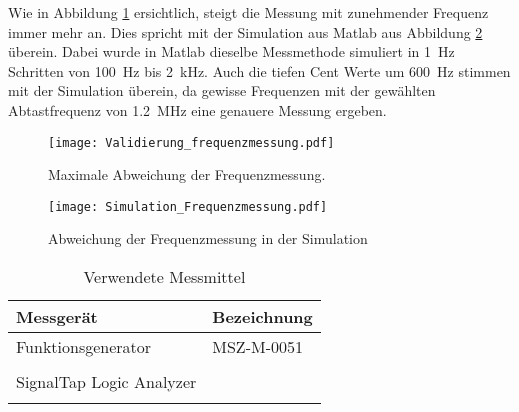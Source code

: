  Wie in Abbildung \ref{img:plot_frequenzmessung} ersichtlich, steigt die Messung mit zunehmender Frequenz immer mehr an. Dies spricht mit der Simulation aus Matlab aus Abbildung \ref{img:plot_freq_sim} überein. Dabei wurde in Matlab dieselbe Messmethode simuliert in \SI{1}{Hz} Schritten von \SI{100}{Hz} bis \SI{2}{kHz}. Auch die tiefen Cent Werte um \SI{600}{Hz} stimmen mit der Simulation überein, da gewisse Frequenzen mit der gewählten Abtastfrequenz von \SI{1.2}{MHz} eine genauere Messung ergeben.
 \begin{figure}[h]
 	\centering
 	\texttt{[image: Validierung\_frequenzmessung.pdf]}
 	\caption{Maximale Abweichung der Frequenzmessung.}
 	\label{img:plot_frequenzmessung}
 \end{figure}
 \begin{figure}[h]
	\centering
	\texttt{[image: Simulation\_Frequenzmessung.pdf]}
	\caption{Abweichung der Frequenzmessung in der Simulation}
	\label{img:plot_freq_sim}
\end{figure}
\begin{table}[H]
	\centering
	\caption{Verwendete Messmittel}
	\label{tab:Verwendete_Messmittel_freq}
	\begin{tabular}{l|l}
		\textbf{Messgerät} & \textbf{Bezeichnung}	\\
		\hline \hline
		
		Funktionsgenerator  & MSZ-M-0051   \\ 
		&        \\ 
		\hline
		SignalTap Logic Analyzer  &    \\ 
		&        \\ 
			\hline
	\end{tabular}
\end{table} 

\pagebreak
